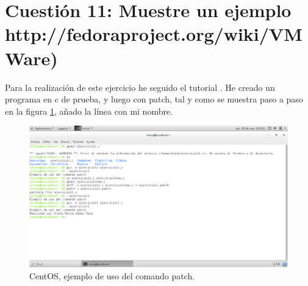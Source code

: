 






\section{Cuestión 11: Muestre un ejemplo http://fedoraproject.org/wiki/VMWare)}
Para la realización de este ejercicio he seguido el tutorial \cite{patch}. He creado un programa en c de prueba, y luego con patch, tal y como se muestra paso a paso en la figura \ref{fig:ejercicio11}, añado la línea con mi nombre.

\begin{figure}[H] 
	\centering
	\includegraphics[width=15cm]{./img/ejercicio11.png} 	
	\caption{CentOS, ejemplo de uso del comando patch.} \label{fig:ejercicio11}
\end{figure}



